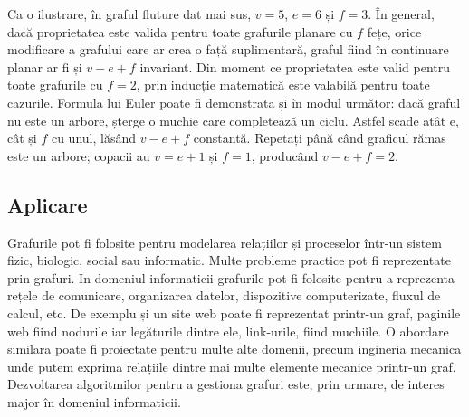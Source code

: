 Ca o ilustrare, în graful fluture dat mai sus, \(v = 5\), \(e = 6\) și \(f = 3\). În general, dacă proprietatea este valida 
pentru toate grafurile planare cu \(f\) fețe, orice modificare a grafului care ar crea o față suplimentară, graful 
fiind în continuare planar ar fi și \(v - e + f\) invariant. Din moment ce proprietatea este valid pentru toate grafurile 
cu \(f = 2\), prin inducție matematică este valabilă pentru toate cazurile. Formula lui Euler poate fi demonstrata și în 
modul următor: dacă graful nu este un arbore, șterge o muchie care completează un ciclu. Astfel scade atât e, cât și 
\(f\) cu unul, lăsând \(v - e + f\) constantă. Repetați până când graficul rămas este un arbore; copacii au \(v = e + 1\) și \(f = 1\), 
producând \(v - e + f = 2\).\newline

\subsection{Aplicare}

Grafurile pot fi folosite pentru modelarea relațiilor și proceselor într-un sistem fizic, biologic, 
social sau informatic. Multe probleme practice pot fi reprezentate prin grafuri. In domeniul informaticii 
grafurile pot fi folosite pentru a reprezenta rețele de comunicare, organizarea datelor, dispozitive computerizate, 
fluxul de calcul, etc. De exemplu și un site web poate fi reprezentat printr-un graf, paginile web fiind nodurile 
iar legăturile dintre ele, link-urile, fiind muchiile. O abordare similara poate fi proiectate pentru multe alte domenii, 
precum ingineria mecanica unde putem exprima relațiile dintre mai multe elemente mecanice printr-un graf. Dezvoltarea 
algoritmilor pentru a gestiona grafuri este, prin urmare, de interes major în domeniul informaticii.










